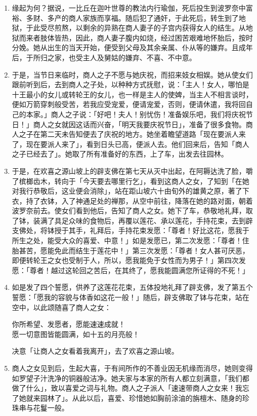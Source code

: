 \begin{enumerate}\item 缘起为何？据说，一比丘在迦叶世尊的教法内行瑜伽，死后投生到波罗奈中富裕、多财、多产的商人家族而享福。随后犯了通奸，于此死后，转生到了地狱，于此受尽煎熬，以剩余的异熟在商人妻子的子宫内获得女人的结生。从地狱而来者肢体皆热，因此，商人妻子腹内如烧，经过困苦艰难地怀胎后，按时分娩。她从出生的当天开始，便受到父母及其余亲属、仆从等的嫌弃。且成年后，于所归之家，也受主人及舅姑的嫌弃、不喜、不中意。
\item 于是，当节日来临时，商人之子不愿与她庆祝，而招来妓女相娱。她从使女们跟前听到后，去到商人之子处，以种种方式抚慰，说：「主人！女人，哪怕是十王最小的女儿或转轮王的女儿，也一样是主人的使婢，当主人不相言谈时，便如万箭穿刺般受苦，若我应受宠爱，便请宠爱，否则，便请休遣，我将回自己的本家。」商人之子说：「好吧！夫人！别忧伤！准备娱乐吧，我们将庆祝节日！」商人之女就因这话而兴奋，「明天我要庆祝节日」，准备了很多食物。商人之子在第二天未告知便去了庆祝的地方。她坐着瞻望道路「现在要派人来了，现在要派人来了」，看到日头已高，便派人去。他们回来后，告知「商人之子已经去了」。她取了所有准备好的东西，上了车，出发去往园林。
\item 于是，在欢喜之源山坡上的辟支佛在第七天从灭中出起，在阿耨达洗了脸，嚼了槟榔齿木，转向于「今天要去哪里行乞」，看到这商人之女，了知到「在她对我行恭敬后，这业便会消除」，站在距山坡六十由旬外的雄黄之原，著了下衣，持了衣钵，入了神通足处的禅那，从空中前往，降落在她的路对面，朝着波罗奈前去。使女们看到他后，告知了商人之女。她下了车，恭敬地礼拜，取了钵，装满了具足众味的食物后，再覆以莲花、承以莲花，手持花束，去到辟支佛处，将钵授于其手，礼拜后，手持花束发愿：「尊者！好比这花，愿我于所生之处，能受大众的喜爱、中意！」如是发愿已，第二次发愿：「尊者！住胎甚苦，愿能免此而结生于莲花中！」第三次发愿：「尊者！女人甚可厌恶，即便转轮王之女也受制于人，所以，愿我能免于女性而为男子！」第四次发愿：「尊者！越过这轮回之苦后，在其终了，愿我能圆满您所证得的不死！」
\item 如是发了四个誓愿，供养了这莲花花束，五体投地礼拜了辟支佛，发了第五个誓愿：「愿我的容貌与体香如这花一般！」随后，辟支佛取了钵与花束，站在空中，以此颂随喜了商人之女：\begin{quoting}你所希望、发愿者，愿能速速成就！\\愿一切意图皆能圆满，如十五的月亮般！\end{quoting}决意「让商人之女看着我离开」，去了欢喜之源山坡。
\item 商人之女见到后，生起大喜，于有间所作的不善业因无机缘而消尽，她则变得如罗望子汁洗净的铜器般洁净。她夫家与本家的所有人都立刻满意，「我们都做了什么」，致以喜爱之词与礼物。商人之子派人「速速带商人之女来！我忘了她就来园林了」。从此以后，喜爱、珍惜她如胸前涂油的旃檀木、随身的珍珠串与花鬘一般。

\end{enumerate}
